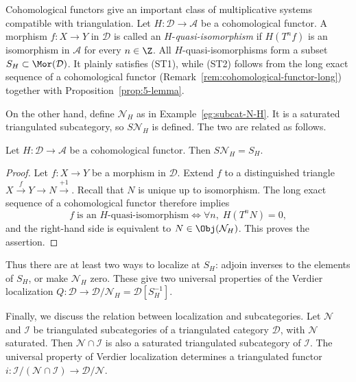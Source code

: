 \begin{example}\label{eg:cohomological-functor-multiplicative}
	Cohomological functors give an important class of multiplicative systems
	compatible with triangulation. Let
	$H: \mathcal{D} \to \mathcal{A}$ be a cohomological functor. A morphism
	$f: X \to Y$ in $\mathcal{D}$ is called an
	$H$-\emph{quasi-isomorphism} if $H(T^n f)$ is an isomorphism in
	$\mathcal{A}$ for every $n \in \Z$. All $H$-quasi-isomorphisms form a
	subset $S_H \subset \Mor(\mathcal{D})$. It plainly satisfies (ST1), while
	(ST2) follows from the long exact sequence of a cohomological functor
	(Remark~\ref{rem:cohomological-functor-long}) together with
	Proposition~\ref{prop:5-lemma}.

	On the other hand, define $\mathcal{N}_H$ as in
	Example~\ref{eg:subcat-N-H}. It is a saturated triangulated subcategory,
	so $S\mathcal{N}_H$ is defined. The two are related as follows.
\end{example}

\begin{proposition}\label{prop:cohomological-functor-multiplicative}
	Let $H: \mathcal{D} \to \mathcal{A}$ be a cohomological functor. Then
	$S\mathcal{N}_H = S_H$.
\end{proposition}

\begin{proof}
	Let $f: X \to Y$ be a morphism in $\mathcal{D}$. Extend $f$ to a
	distinguished triangle
	$X \xrightarrow{f} Y \to N \xrightarrow{+1}$. Recall that $N$ is unique
	up to isomorphism. The long exact sequence of a cohomological functor
	therefore implies
	\[ f \;\text{is an $H$-quasi-isomorphism} \iff \forall n, \; H(T^n N) = 0, \]
	and the right-hand side is equivalent to
	$N \in \Obj(\mathcal{N}_H)$. This proves the assertion.
\end{proof}

Thus there are at least two ways to localize at $S_H$: adjoin inverses to the
elements of $S_H$, or make $\mathcal{N}_H$ zero. These give two universal
properties of the Verdier localization
$Q: \mathcal{D} \to \mathcal{D}/\mathcal{N}_H
= \mathcal{D}[S_H^{-1}]$.

Finally, we discuss the relation between localization and subcategories. Let
$\mathcal{N}$ and $\mathcal{I}$ be triangulated subcategories of a
triangulated category $\mathcal{D}$, with $\mathcal{N}$ saturated. Then
$\mathcal{N} \cap \mathcal{I}$ is also a saturated triangulated subcategory
of $\mathcal{I}$. The universal property of Verdier localization determines
a triangulated functor
$i: \mathcal{I}/(\mathcal{N} \cap \mathcal{I}) \to
\mathcal{D}/\mathcal{N}$.

